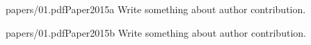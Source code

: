 \begin{paper}{papers/01.pdf}{Paper2015a}
  Write something about author contribution.
\end{paper}

\begin{paper}{papers/01.pdf}{Paper2015b}
  Write something about author contribution.
\end{paper}
